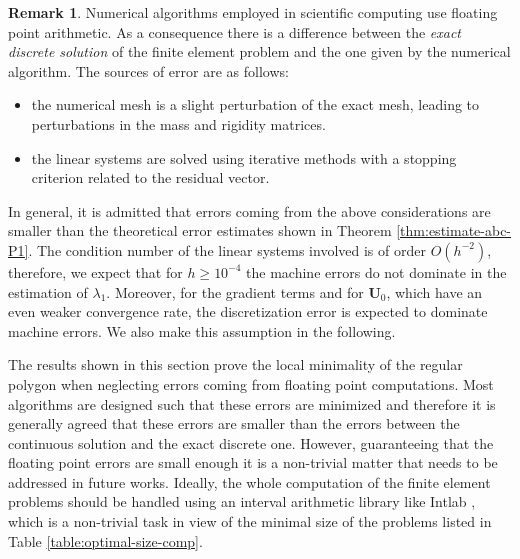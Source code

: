 \documentclass[JEP,XML,SOM,Unicode,ThmDefs,NoFloatCountersInSection,published]{cedram}
\theoremstyle{plain}
\theoremstyle{definition}
\newtheorem{rem}[thm]{Remark}
\newcommand{\bo}[1]{{\boldsymbol#1}}
\begin{document}
\begin{rem}
Numerical algorithms employed in scientific computing use floating point arithmetic. As a consequence there is a difference between the \emph{exact discrete solution} of the finite element problem and the one given by the numerical algorithm. The sources of error are as follows:
\begin{itemize}
\item the numerical mesh is a slight perturbation of the exact mesh, leading to perturbations in the mass and rigidity matrices.
\item the linear systems are solved using iterative methods with a stopping criterion related to the residual vector.
\end{itemize}
In general, it is admitted that errors coming from the above considerations are smaller than the theoretical error estimates shown in Theorem \ref{thm:estimate-abc-P1}. The condition number of the linear systems involved is of order $O(h^{-2})$, therefore, we expect that for $h\geq 10^{-4}$ the machine errors do not dominate in the estimation of $\lambda_1$. Moreover, for the gradient terms and for $\bo U_0$, which have an even weaker convergence rate, the discretization error is expected to dominate machine errors. We also make this assumption in the following.

The results shown in this section prove the local minimality of the regular polygon when neglecting errors coming from floating point computations. Most algorithms are designed such that these errors are minimized and therefore it is generally agreed that these errors are smaller than the errors between the continuous solution and the exact discrete one. However, guaranteeing that the floating point errors are small enough it is a non-trivial matter that needs to be addressed in future works. Ideally, the whole computation of the finite element problems should be handled using an interval arithmetic library like Intlab \cite{intlab}, which is a non-trivial task in view of the minimal size of the problems listed in Table \ref{table:optimal-size-comp}.
\end{rem}
\end{document}
